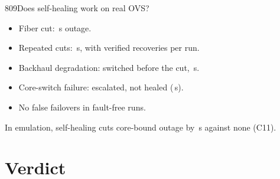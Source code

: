 \begin{qa}{809}{Does self-healing work on real OVS?}
\begin{itemize}
\item Fiber cut: \NOvsFiberCutOutage\,s outage.
\item Repeated cuts: \NOvsRepeatedFiberCutOutage\,s, with \NOvsRepeatedFiberCutVerified{} verified recoveries per
run.
\item Backhaul degradation: switched before the cut, \NOvsBackhaulDegradationOutage\,s.
\item Core-switch failure: escalated, not healed (\NOvsCoreSwitchFailureOutage\,s).
\item No false failovers in \NOvsNoFaultRuns{} fault-free runs.
\end{itemize}
In emulation, self-healing cuts core-bound outage by \NFCOneOneDiff\,s against none (C11).
\end{qa}

\section{Verdict}

